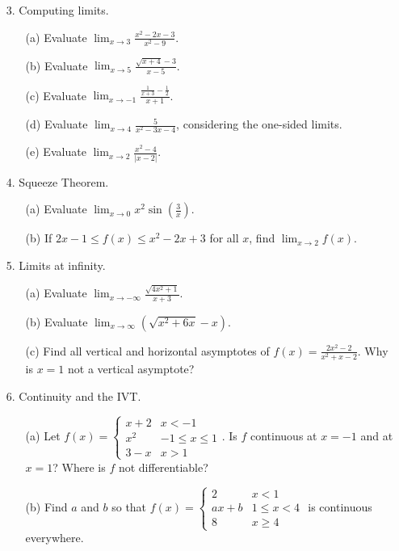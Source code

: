 \documentclass[12pt]{article}
\newcommand\abs[1]{\left| #1 \right|} %
\newcommand\parens[1]{\left( #1 \right)}
\begin{document}
\begin{enumerate}
\begin{enumerate}
\end{enumerate}
\item[3.] Computing limits.
\begin{enumerate}
\item[(a)] Evaluate $\lim_{x \to 3} \frac{x^2-2x-3}{x^2-9}$.
\item[(b)] Evaluate $\lim_{x \to 5} \frac{\sqrt{x+4}-3}{x-5}$.
\item[(c)] Evaluate $\lim_{x \to -1} \frac{\frac{1}{x+3} - \frac{1}{2}}{x+1}$.
\item[(d)] Evaluate $\lim_{x \to 4} \frac{5}{x^2-3x-4}$, considering the one-sided limits.
\item[(e)] Evaluate $\lim_{x \to 2} \frac{x^2-4}{\abs{x-2}}$.
\end{enumerate}
\item[4.] Squeeze Theorem.
\begin{enumerate}
\item[(a)] Evaluate $\lim_{x \to 0} x^2 \sin\parens{\frac{3}{x}}$.
\item[(b)] If $2x - 1 \leq f(x) \leq x^2 - 2x + 3$ for all $x$, find $\lim_{x \to 2} f(x)$.
\end{enumerate}
\item[5.] Limits at infinity.
\begin{enumerate}
\item[(a)] Evaluate $\lim_{x \to -\infty} \frac{\sqrt{4x^2+1}}{x+3}$.
\item[(b)] Evaluate $\lim_{x \to \infty} \parens{\sqrt{x^2+6x} - x}$.
\item[(c)] Find all vertical and horizontal asymptotes of $f(x) = \frac{2x^2-2}{x^2+x-2}$. Why is $x=1$ not a vertical asymptote?
\end{enumerate}
\item[6.] Continuity and the IVT.
\begin{enumerate}
\item[(a)] Let $f(x) = \begin{cases} x+2 & x < -1 \\ x^2 & -1 \leq x \leq 1 \\ 3-x & x > 1 \end{cases}$. Is $f$ continuous at $x=-1$ and at $x=1$? Where is $f$ not differentiable?
\item[(b)] Find $a$ and $b$ so that $f(x) = \begin{cases} 2 & x < 1 \\ ax + b & 1 \leq x < 4 \\ 8 & x \geq 4 \end{cases}$ is continuous everywhere.

\end{enumerate}
\end{enumerate}
\end{document}
